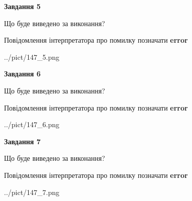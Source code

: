 \documentclass[10pt, ukrainian]{article}
\begin{document}
{\begin {large}
{\begin {center}\textbf{Завдання 5}\end {center}}\par
Що буде виведено за виконання? \par
Повідомлення інтерпретатора про помилку позначати \textbf{error}

\begin{center}
	{../pict/147_5.png}
\end{center}
\newpage

{\begin {center}\textbf{Завдання 6}\end {center}}\par
Що буде виведено за виконання? \par
Повідомлення інтерпретатора про помилку позначати \textbf{error}

\begin{center}
	{../pict/147_6.png}
\end{center}
\newpage

{\begin {center}\textbf{Завдання 7}\end {center}}\par
Що буде виведено за виконання? \par
Повідомлення інтерпретатора про помилку позначати \textbf{error}

\begin{center}
	{../pict/147_7.png}
\end{center}
\newpage

\end {large}}
\end{document}
